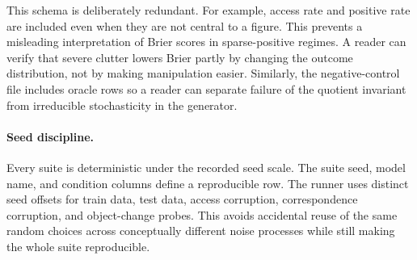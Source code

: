 \documentclass{article}
\begin{document}
\begin{table}[h]
\centering
\caption{Audit schema for the full-scale result files.}
\label{tab:schema}
\end{table}

This schema is deliberately redundant. For example, access rate and positive rate are included even when they are not central to a figure. This prevents a misleading interpretation of Brier scores in sparse-positive regimes. A reader can verify that severe clutter lowers Brier partly by changing the outcome distribution, not by making manipulation easier. Similarly, the negative-control file includes oracle rows so a reader can separate failure of the quotient invariant from irreducible stochasticity in the generator.

\paragraph{Seed discipline.}
Every suite is deterministic under the recorded seed scale. The suite seed, model name, and condition columns define a reproducible row. The runner uses distinct seed offsets for train data, test data, access corruption, correspondence corruption, and object-change probes. This avoids accidental reuse of the same random choices across conceptually different noise processes while still making the whole suite reproducible.
\end{document}
